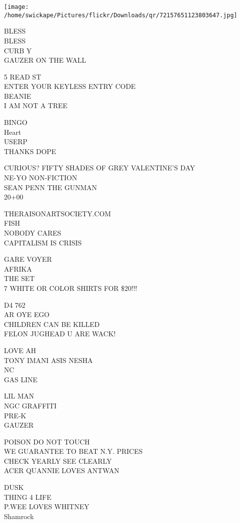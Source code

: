 \documentclass[10pt,letterpaper]{article}
\begin{document}
\texttt{[image: /home/swickape/Pictures/flickr/Downloads/qr/72157651123803647.jpg]}


BLESS\\
BLESS\\
CURB Y\\
GAUZER ON THE WALL

5 READ ST\\
ENTER YOUR KEYLESS ENTRY CODE\\
BEANIE\\
I AM NOT A TREE

BINGO\\
Heart\\
USERP\\
THANKS DOPE

CURIOUS?  FIFTY SHADES OF GREY VALENTINE'S DAY\\
NE{-}YO NON{-}FICTION\\
SEAN PENN THE GUNMAN\\
20+00

THERAISONARTSOCIETY.COM\\
FISH\\
NOBODY CARES\\
CAPITALISM IS CRISIS

GARE VOYER\\
AFRIKA\\
THE SET\\
7 WHITE OR COLOR SHIRTS FOR \$20!!!

D4 762\\
AR OYE EGO\\
CHILDREN CAN BE KILLED\\
FELON JUGHEAD U ARE WACK!

LOVE AH\\
TONY IMANI ASIS NESHA\\
NC\\
GAS LINE

LIL MAN\\
NGC GRAFFITI\\
PRE{-}K\\
GAUZER

POISON DO NOT TOUCH\\
WE GUARANTEE TO BEAT N.Y. PRICES\\
CHECK YEARLY SEE CLEARLY\\
ACER QUANNIE LOVES ANTWAN

DUSK\\
THING 4 LIFE\\
P.WEE LOVES WHITNEY\\
Shamrock
\end{document}
